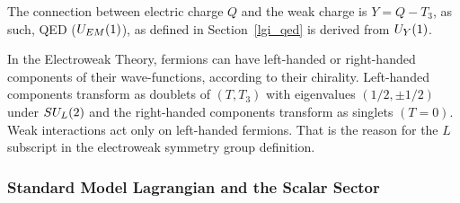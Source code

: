 The connection between electric charge $Q$ and the weak charge is $Y = Q - T_3$, as such, QED ($U_{\scaleto{EM}{5pt}}(1)$), as defined in Section~\ref{lgi_qed} is derived from $U_{\scaleto{Y}{5pt}}(1)$.

In the Electroweak Theory, fermions can have left-handed or right-handed components of their wave-functions, according to their chirality. Left-handed components transform as doublets of $(T, T_3)$ with eigenvalues $(1/2, \pm1/2)$ under $SU_{\scaleto{L}{5pt}}(2)$ and the right-handed components transform as singlets $(T=0)$. Weak interactions act only on left-handed fermions. That is the reason for the $L$ subscript in the electroweak symmetry group definition.

\subsubsection{Standard Model Lagrangian and the Scalar Sector}



